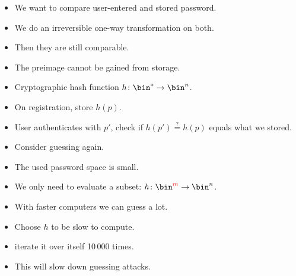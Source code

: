 \begin{frame}
  \begin{solution}[Passwords]
    \begin{itemize}
      \item We want to compare user-entered and stored password.
      \item We do an irreversible one-way transformation on both.
      \item Then they are still comparable.
      \item The preimage cannot be gained from storage.
    \end{itemize}
  \end{solution}

  \pause{}

  \begin{example}
    \begin{itemize}
      \item Cryptographic hash function \(h\colon \bin^*\to \bin^n\).
      \item On registration, store \(h(p)\).
      \item User authenticates with \(p'\), check if \(h(p') \stackrel{?}{=}  
          h(p)\) equals what we stored.
    \end{itemize}
  \end{example}
\end{frame}

\begin{frame}
  \begin{remark}
    \begin{itemize}
      \item Consider guessing again.
      \item The used password space is small.
      \item We only need to evaluate a subset: \(h\colon 
          \bin^{\color{red}{m}}\to \bin^n\).
      \item With faster computers we can guess a lot.
    \end{itemize}
  \end{remark}

  \pause

  \begin{solution}
    \begin{itemize}
      \item Choose \(h\) to be slow to compute.
      \item \Eg iterate it over itself 10\,000 times.
      \item This will slow down guessing attacks.
    \end{itemize}
  \end{solution}
\end{frame}

